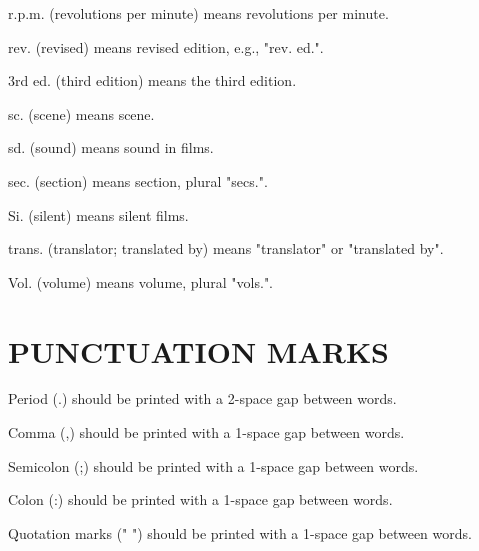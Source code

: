 r.p.m. (revolutions per minute) means revolutions per minute.

rev. (revised) means revised edition, e.g., "rev. ed.".

3rd ed. (third edition) means the third edition.

sc. (scene) means scene.

sd. (sound) means sound in films.

sec. (section) means section, plural "secs.".

Si. (silent) means silent films.

trans. (translator; translated by) means "translator" or "translated by".

Vol. (volume) means volume, plural "vols.".

\section{PUNCTUATION MARKS}

Period (.) should be printed with a 2-space gap between words.

Comma (,) should be printed with a 1-space gap between words.

Semicolon (;) should be printed with a 1-space gap between words.

Colon (:) should be printed with a 1-space gap between words.

Quotation marks (" ") should be printed with a 1-space gap between words.
